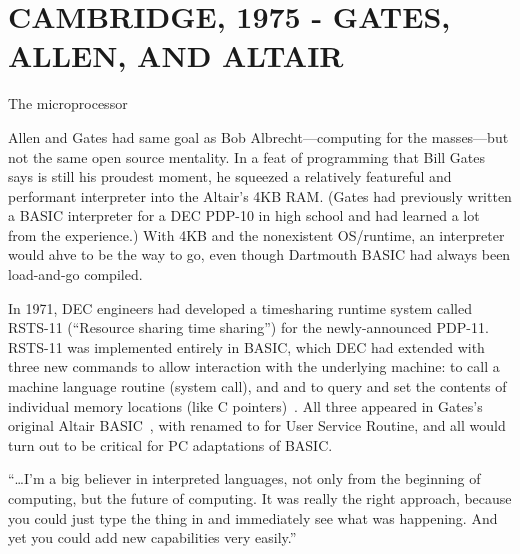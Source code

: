 
\section{CAMBRIDGE, 1975 - GATES, ALLEN, AND ALTAIR}

\begin{milestone}{The microprocessor}

\end{milestone}



Allen and Gates had same goal as Bob Albrecht---computing for the
masses---but not the 
same open source mentality.  In a feat of programming that Bill Gates
says is still his proudest moment, he squeezed a relatively featureful
and performant interpreter into the Altair's 4KB RAM.  (Gates had
previously written a BASIC interpreter for  a DEC PDP-10 in high school and
had learned a lot from the experience.)  With 4KB and the nonexistent
OS/runtime, an interpreter would ahve to be the way to go, even though
Dartmouth BASIC had always been load-and-go compiled.

In 1971, DEC engineers had developed a timesharing runtime system called
RSTS-11 (``Resource sharing time sharing'') for the newly-announced
PDP-11.  
RSTS-11 was implemented entirely in BASIC, 
which DEC had
extended with three new commands to allow interaction with the underlying
machine:  to call a machine language routine (system call), and
 and  to query and set the contents of individual memory
locations (like C pointers)~\cite[pp.~204--205]{ceruzzi}.
All three appeared in Gates's original Altair
BASIC~\cite{smithsonian_interview}, with  
renamed to  for User Service Routine, and
all would turn out to be critical for PC adaptations of 
BASIC. 


``\ldots I'm a big believer in interpreted languages,
not only from the beginning of computing, but the future of
computing. It was really the right approach, because you could just type
the thing in and immediately see what was happening. And yet you could
add new capabilities very easily.'' ~\cite{smithsonian_interview}


